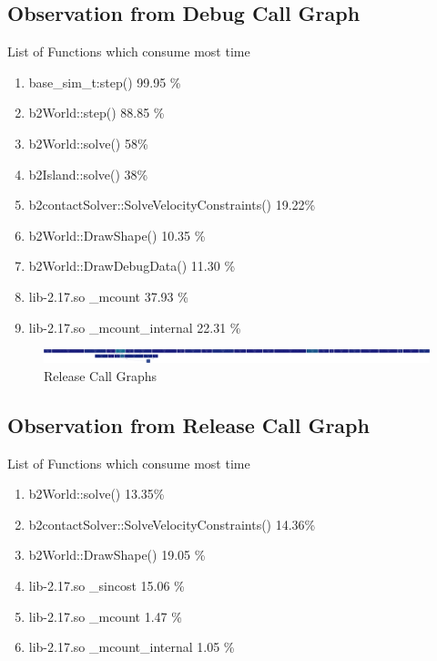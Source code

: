 \documentclass[11pt,]{article}
\begin{document}
\begin{singlespace}
\subsection*{Observation from Debug Call Graph}
List of Functions which consume most time
\begin{enumerate}
    \item base\_sim\_t:step() 99.95 \%
    \item b2World::step() 88.85 \%
    \item b2World::solve() 58\%
    \item b2Island::solve() 38\%
    \item b2contactSolver::SolveVelocityConstraints() 19.22\%
    \item b2World::DrawShape() 10.35 \%
    \item b2World::DrawDebugData() 11.30 \%
    \item lib-2.17.so \_mcount 37.93 \%
    \item lib-2.17.so \_mcount\_internal 22.31 \%
\end{enumerate}

\begin{figure}[h!]
	\centering
	\caption{Release Call Graphs}
		\includegraphics[width=1\textwidth]{release.png}
\end{figure}

\subsection*{Observation from Release Call Graph}
List of Functions which consume most time
\begin{enumerate}
    \item b2World::solve() 13.35\%
    \item b2contactSolver::SolveVelocityConstraints() 14.36\%
    \item b2World::DrawShape() 19.05 \%
    \item lib-2.17.so \_sincost 15.06 \%
    \item lib-2.17.so \_mcount 1.47 \%
    \item lib-2.17.so \_mcount\_internal 1.05 \%
\end{enumerate}


\end{singlespace}
\end{document}
